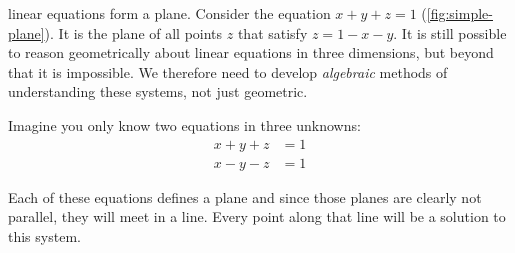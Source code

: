 \documentclass{tufte-book}
\begin{document}
 linear equations form a plane. Consider the equation $x + y + z = 1$
(\cref{fig:simple-plane}).
It is the plane of all points $z$ that satisfy $z=1-x-y$. It is still possible to reason geometrically about linear
equations in three dimensions, but beyond that it is impossible. We therefore need to develop \emph{algebraic} methods
of understanding these systems, not just geometric.

Imagine you only know two equations in three unknowns:
\begin{align*}
	x+y+z & = 1 \\
	x-y-z & = 1
\end{align*}
\begin{marginfigure}[-3cm]
	\caption{The plane $x + y + z = 1$.}
	\label{fig:simple-plane}
\end{marginfigure}
Each of these equations defines a plane and since those planes are clearly not parallel, they will meet in a line.
Every point along that line will be a solution to this system.
\end{document}
